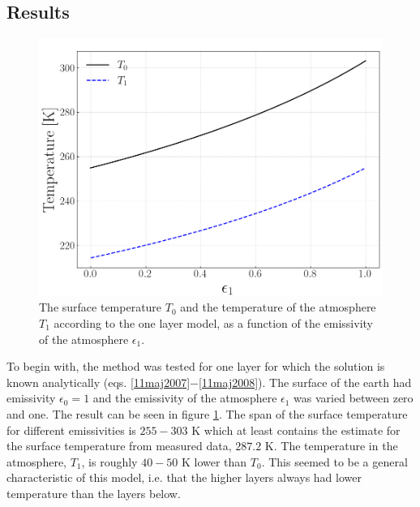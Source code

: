 \documentclass[twocolumn]{article}
\begin{document}
\begin{large}
\subsection*{Results}
\begin{figure}[!b]
    \begin{center}
        \includegraphics[scale=0.35]{OneLayer.png}
    \end{center}
    \caption{The surface temperature $T_0$ and the temperature of the atmosphere $T_1$ according to the one layer model, as a function of the emissivity of the atmosphere $\epsilon_1$.}
    \label{9maj1827}
\end{figure}
To begin with, the method was tested for one layer for which the solution is known analytically (eqs. \eqref{11maj2007}$-$\eqref{11maj2008}). The surface of the earth had emissivity $\epsilon_0=1$ and the emissivity of the atmosphere $\epsilon_1$ was varied between zero and one. The result can be seen in figure \ref{9maj1827}. The span of the surface temperature for different emissivities is $255-303$ K which at least contains the estimate for the surface temperature from measured data, $287.2$ K. The temperature in the atmosphere, $T_1$, is roughly $40-50$ K lower than $T_0$. This seemed to be a general characteristic of this model, i.e. that the higher layers always had lower temperature than the layers below. 
\begin{figure}[!t]
    \begin{center}

\end{center}
\end{figure}
\end{large}
\end{document}
